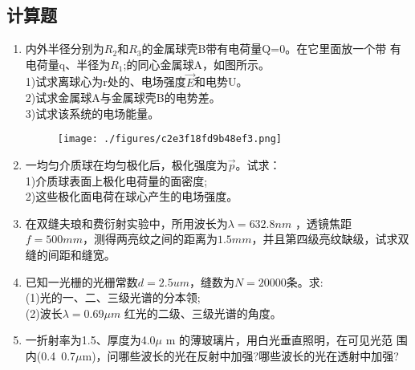 \subsection{计算题}
\begin{enumerate}
\item 内外半径分别为$R_2$和$R_3$的金属球壳B带有电荷量Q=0。在它里面放一个带
有电荷量q、半径为$R_1$;的同心金属球A，如图所示。\\
1)试求离球心为r处的、电场强度$\vec E$和电势U。\\
2)试求金属球A与金属球壳B的电势差。\\
3)试求该系统的电场能量。\\
\begin{figure}[ht]
\centering
\texttt{[image: ./figures/c2e3f18fd9b48ef3.png]}
\caption{} \label{fig_CD09_4}
\end{figure}
\item 一均匀介质球在均匀极化后，极化强度为$\vec p$。试求：\\
1)介质球表面上极化电荷量的面密度;\\
2)这些极化面电荷在球心产生的电场强度。
\item 在双缝夫琅和费衍射实验中，所用波长为$\lambda=632.8nm$ ，透镜焦距
$f=500mm$，测得两亮纹之间的距离为$1.5mm$，并且第四级亮纹缺级，试求双缝的间距和缝宽。
\item 已知一光栅的光栅常数$d=2.5um$，缝数为$N=20000$条。求:\\
(1)光的一、二、三级光谱的分本领;\\
(2)波长$\lambda=0.69\mu m$ 红光的二级、三级光谱的角度。
\item 一折射率为1.5、厚度为4.0$\mu$ m 的薄玻璃片，用白光垂直照明，在可见光范
围内(0.4~0.7$\mu$m)，问哪些波长的光在反射中加强?哪些波长的光在透射中加强?
\end{enumerate}
